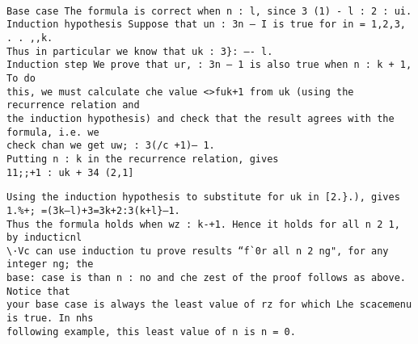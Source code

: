 \documentclass[]{article}
\begin{document}
\begin{verbatim}

Base case The formula is correct when n : l, since 3 (1) - l : 2 : ui.
Induction hypothesis Suppose that un : 3n — I is true for in = 1,2,3, . . ,,k.
Thus in particular we know that uk : 3}: —- l.
Induction step We prove that ur, : 3n — 1 is also true when n : k + 1, To do
this, we must calculate che value <>fuk+1 from uk (using the recurrence relation and
the induction hypothesis) and check that the result agrees with the formula, i.e. we
check chan we get uw; : 3(/c +1)— 1.
Putting n : k in the recurrence relation, gives
11;;+1 : uk + 34 (2,1]
\end{verbatim}

\begin{verbatim}
Using the induction hypothesis to substitute for uk in [2.}.), gives
1.%+; =(3k—l)+3=3k+2:3(k+l}—1.
Thus the formula holds when wz : k-+1. Hence it holds for all n 2 1, by inducticnl
\·Vc can use induction tu prove results “f`0r all n 2 ng", for any integer ng; the
base: case is than n : no and che zest of the proof follows as above. Notice that
your base case is always the least value of rz for which Lhe scacemenu is true. In nhs
following example, this least value of n is n = 0.
\end{verbatim}
\newpage

\end{document}
